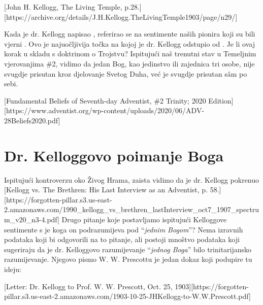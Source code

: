 [John H. Kellogg, The Living Temple, p.28.][https://archive.org/details/J.H.Kellogg.TheLivingTemple1903/page/n29/]

Kada je dr. Kellogg napisao , referirao se na sentimente naših pionira koji su bili vjerni . Ovo je najuočljivija točka na kojoj je dr. Kellogg odstupio od . Je li ovaj korak u skladu s doktrinom o Trojstvu? Ispitujući naš trenutni stav u Temeljnim vjerovanjima \#2, vidimo da jedan Bog, kao jedinstvo ili zajednica tri osobe, nije svugdje prisutan kroz djelovanje Svetog Duha, već je svugdje prisutan sâm po sebi.

[Fundamental Beliefs of Seventh-day Adventist, \#2 Trinity; 2020 Edition][https://www.adventist.org/wp-content/uploads/2020/06/ADV-28Beliefs2020.pdf]

\section*{Dr. Kelloggovo poimanje Boga}

Ispitujući kontroverzu oko Živog Hrama, zaista vidimo da je dr. Kellogg pokrenuo [Kellogg vs. The Brethren: His Last Interview as an Adventist, p. 58.][https://forgotten-pillar.s3.us-east-2.amazonaws.com/1990\_kellogg\_vs\_brethren\_lastInterview\_oct7\_1907\_spectrum\_v20\_n3-4.pdf] Drugo pitanje koje postavljamo ispitujući Kelloggove sentimente s  je koga on podrazumijeva pod “\textit{jednim Bogom}”? Nema izravnih podataka koji bi odgovorili na to pitanje, ali postoji mnoštvo podataka koji sugeriraju da je dr. Kelloggovo razumijevanje “\textit{jednog Boga}” bilo trinitarijansko razumijevanje. Njegovo pismo W. W. Prescottu je jedan dokaz koji podupire tu ideju:

[Letter: Dr. Kellogg to Prof. W. W. Prescott, Oct. 25, 1903][https://forgotten-pillar.s3.us-east-2.amazonaws.com/1903-10-25-JHKellogg-to-W.W.Prescott.pdf]

